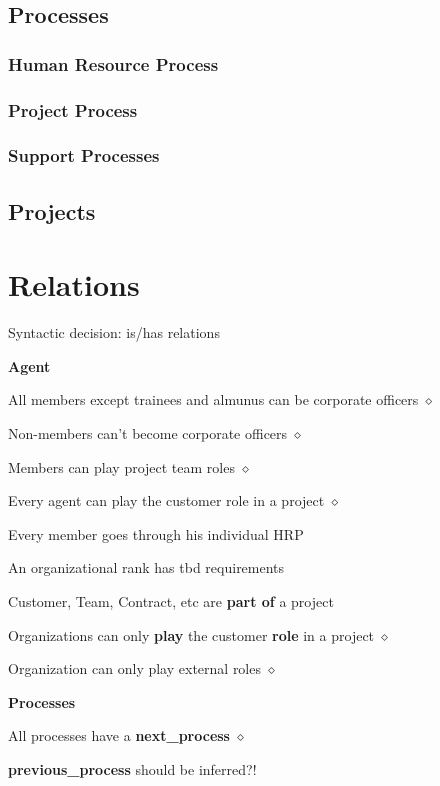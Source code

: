 \documentclass[a4paper, DIV=13, BCOR=0cm]{scrbook}
\begin{document}
\subsection{Processes}

\subsubsection{Human Resource Process}
\subsubsection{Project Process}
\subsubsection{Support Processes}
\subsection{Projects}

\section{Relations}

Syntactic decision: is/has relations


\textbf{Agent}
\begin{compactitem}
	\item All members except trainees and almunus can be corporate officers $\diamond$
	\item Non-members can't become corporate officers $\diamond$
	\item Members can play project team roles $\diamond$
	\item Every agent can play the customer role in a project $\diamond$
	\item Every member goes through his individual HRP
	\item An organizational rank has tbd requirements
	\item Customer, Team, Contract, etc are \textbf{part of} a project
	\item Organizations can only \textbf{play} the customer \textbf{role} in a project $\diamond$
	\item Organization can only play external roles $\diamond$
\end{compactitem}

\textbf{Processes}
\begin{compactitem}
	\item All processes have a \textbf{next\_process} $\diamond$
	\item \textbf{previous\_process} should be inferred?!
	\item 
\end{compactitem}
\end{document}
